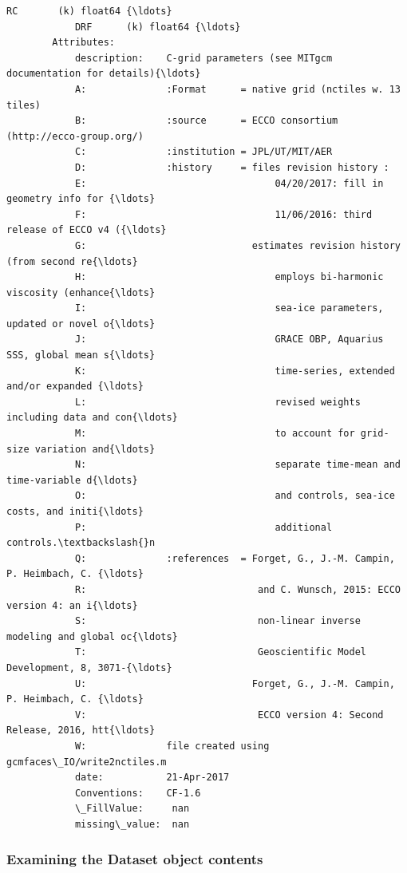 \documentclass[11pt]{article}
\begin{document}
\begin{Verbatim}[commandchars=\\\{\}]
            RC       (k) float64 {\ldots}
            DRF      (k) float64 {\ldots}
        Attributes:
            description:    C-grid parameters (see MITgcm documentation for details){\ldots}
            A:              :Format      = native grid (nctiles w. 13 tiles)
            B:              :source      = ECCO consortium (http://ecco-group.org/)
            C:              :institution = JPL/UT/MIT/AER
            D:              :history     = files revision history :
            E:                                 04/20/2017: fill in geometry info for {\ldots}
            F:                                 11/06/2016: third release of ECCO v4 ({\ldots}
            G:                             estimates revision history (from second re{\ldots}
            H:                                 employs bi-harmonic viscosity (enhance{\ldots}
            I:                                 sea-ice parameters, updated or novel o{\ldots}
            J:                                 GRACE OBP, Aquarius SSS, global mean s{\ldots}
            K:                                 time-series, extended and/or expanded {\ldots}
            L:                                 revised weights including data and con{\ldots}
            M:                                 to account for grid-size variation and{\ldots}
            N:                                 separate time-mean and time-variable d{\ldots}
            O:                                 and controls, sea-ice costs, and initi{\ldots}
            P:                                 additional controls.\textbackslash{}n 
            Q:              :references  = Forget, G., J.-M. Campin, P. Heimbach, C. {\ldots}
            R:                              and C. Wunsch, 2015: ECCO version 4: an i{\ldots}
            S:                              non-linear inverse modeling and global oc{\ldots}
            T:                              Geoscientific Model Development, 8, 3071-{\ldots}
            U:                             Forget, G., J.-M. Campin, P. Heimbach, C. {\ldots}
            V:                              ECCO version 4: Second Release, 2016, htt{\ldots}
            W:              file created using gcmfaces\_IO/write2nctiles.m
            date:           21-Apr-2017
            Conventions:    CF-1.6
            \_FillValue:     nan
            missing\_value:  nan
\end{Verbatim}
            
    \subsubsection{Examining the Dataset object
contents}\label{examining-the-dataset-object-contents}
\end{document}
